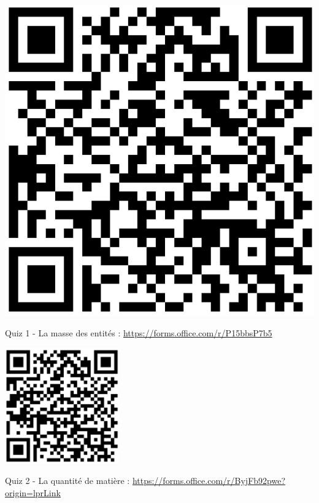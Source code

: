 \documentclass[french, a4paper, 12pt, landscape, twocolumn]{article}
\begin{document}
\begin{center}
	\begin{minipage}{.2\textwidth}
		\centering
		\includegraphics[width=.6\textwidth]{Quiz1.png}

		\protect Quiz 1 - La masse des entités : \url{https://forms.office.com/r/P15bbsP7b5}
	\end{minipage}
	\begin{minipage}{.2\textwidth}
		\centering
		\includegraphics[width=.6\textwidth]{Quiz2.png}

		Quiz 2 - La quantité de matière : \url{https://forms.office.com/r/ByjFb92pwe?origin=lprLink}
	\end{minipage}
\end{center}

\end{document}
